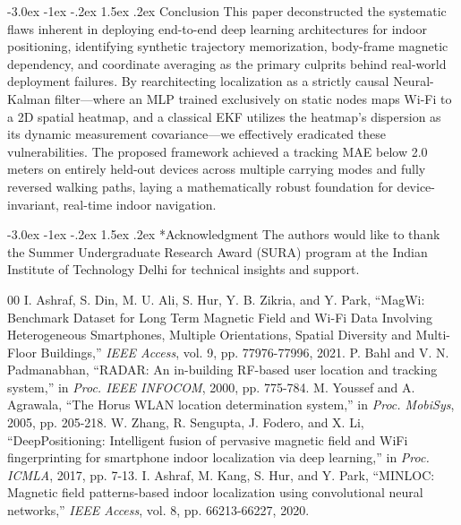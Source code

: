 \documentclass[journal,twoside,compsoc]{IEEEtran}
\makeatletter
\renewcommand{\section}{\@startsection{section}{1}{\z@}%
                       {-3.0ex \@plus -1ex \@minus -.2ex}%
                       {1.5ex \@plus.2ex}%
                       {\normalfont\large\bfseries\sffamily\color{accessblue}}}
\makeatother
\begin{document}
\section{Conclusion}
This paper deconstructed the systematic flaws inherent in deploying end-to-end deep learning architectures for indoor positioning, identifying synthetic trajectory memorization, body-frame magnetic dependency, and coordinate averaging as the primary culprits behind real-world deployment failures. By rearchitecting localization as a strictly causal Neural-Kalman filter—where an MLP trained exclusively on static nodes maps Wi-Fi to a 2D spatial heatmap, and a classical EKF utilizes the heatmap's dispersion as its dynamic measurement covariance—we effectively eradicated these vulnerabilities. The proposed framework achieved a tracking MAE below 2.0 meters on entirely held-out devices across multiple carrying modes and fully reversed walking paths, laying a mathematically robust foundation for device-invariant, real-time indoor navigation.

\section*{Acknowledgment}
The authors would like to thank the Summer Undergraduate Research Award (SURA) program at the Indian Institute of Technology Delhi for technical insights and support.

\begin{thebibliography}{00}
 I. Ashraf, S. Din, M. U. Ali, S. Hur, Y. B. Zikria, and Y. Park, ``MagWi: Benchmark Dataset for Long Term Magnetic Field and Wi-Fi Data Involving Heterogeneous Smartphones, Multiple Orientations, Spatial Diversity and Multi-Floor Buildings,'' \emph{IEEE Access}, vol. 9, pp. 77976-77996, 2021.
 P. Bahl and V. N. Padmanabhan, ``RADAR: An in-building RF-based user location and tracking system,'' in \emph{Proc. IEEE INFOCOM}, 2000, pp. 775-784.
 M. Youssef and A. Agrawala, ``The Horus WLAN location determination system,'' in \emph{Proc. MobiSys}, 2005, pp. 205-218.
 W. Zhang, R. Sengupta, J. Fodero, and X. Li, ``DeepPositioning: Intelligent fusion of pervasive magnetic field and WiFi fingerprinting for smartphone indoor localization via deep learning,'' in \emph{Proc. ICMLA}, 2017, pp. 7-13.
 I. Ashraf, M. Kang, S. Hur, and Y. Park, ``MINLOC: Magnetic field patterns-based indoor localization using convolutional neural networks,'' \emph{IEEE Access}, vol. 8, pp. 66213-66227, 2020.
\end{thebibliography}
\end{document}

